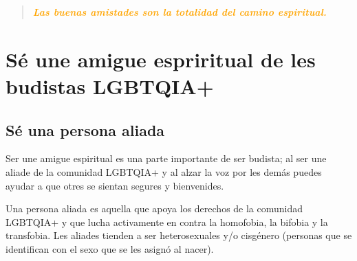 \documentclass[12pt,openany]{book}
\begin{document}
\newpage
\thispagestyle{empty}

\begin{figure}[h]
    \centering
\end{figure}

\begin{quote}
\centering
\doublespacing
\textit{\Large \textcolor{orange}{\textbf{Las buenas amistades son la totalidad del camino espiritual.}}}
\end{quote}

\chapter*{Sé une amigue espriritual de les budistas LGBTQIA+}

\section*{Sé una persona aliada}

Ser une amigue espiritual es una parte importante de ser budista; al ser une aliade de la comunidad LGBTQIA+ y al alzar la voz por les demás  puedes ayudar a que otres se sientan segures y bienvenides.

Una persona aliada es aquella que apoya los derechos de la comunidad LGBTQIA+ y que lucha activamente en contra la homofobia, la bifobia y la transfobia. Les aliades tienden a ser heterosexuales y/o cisgénero (personas que se identifican con el sexo que se les asignó al nacer).
\end{document}
